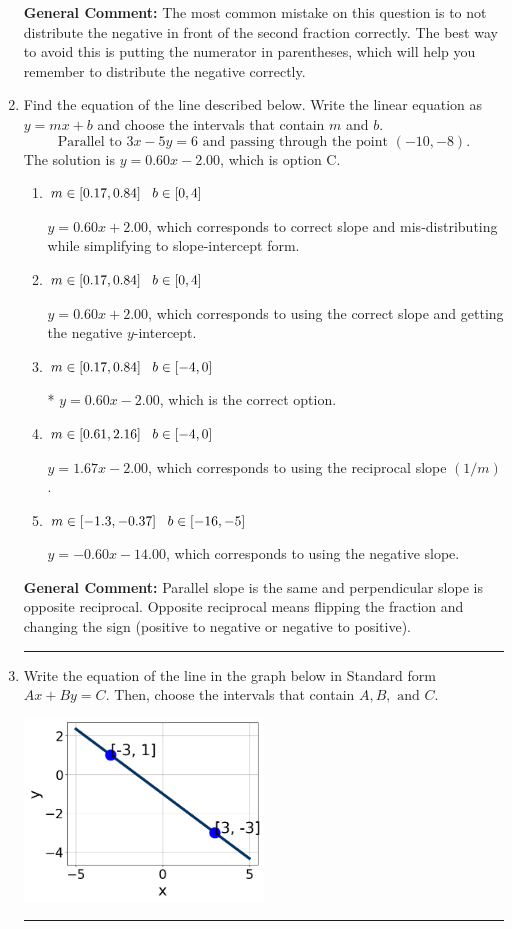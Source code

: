 \documentclass{extbook}[14pt]
\newcommand{\litem}[1]{\item #1

\rule{\textwidth}{0.4pt}}
\begin{document}
\begin{enumerate}
{\textbf{General Comment:} The most common mistake on this question is to not distribute the negative in front of the second fraction correctly. The best way to avoid this is putting the numerator in parentheses, which will help you remember to distribute the negative correctly.
}
\litem{
Find the equation of the line described below. Write the linear equation as $ y=mx+b $ and choose the intervals that contain $m$ and $b$.
\[ \text{Parallel to } 3 x - 5 y = 6 \text{ and passing through the point } (-10, -8). \]The solution is \( y = 0.60x - 2.00 \), which is option C.\begin{enumerate}[label=\Alph*.]
\item \( m \in [0.17, 0.84] \hspace*{3mm} b \in [0, 4] \)

 $y = 0.60x + 2.00$, which corresponds to correct slope and mis-distributing while simplifying to slope-intercept form.
\item \( m \in [0.17, 0.84] \hspace*{3mm} b \in [0, 4] \)

 $y = 0.60x + 2.00$, which corresponds to using the correct slope and getting the negative $y$-intercept.
\item \( m \in [0.17, 0.84] \hspace*{3mm} b \in [-4, 0] \)

* $y = 0.60x - 2.00$, which is the correct option.
\item \( m \in [0.61, 2.16] \hspace*{3mm} b \in [-4, 0] \)

 $y = 1.67x - 2.00$, which corresponds to using the reciprocal slope $(1/m)$.
\item \( m \in [-1.3, -0.37] \hspace*{3mm} b \in [-16, -5] \)

 $y = -0.60x - 14.00$, which corresponds to using the negative slope.
\end{enumerate}

\textbf{General Comment:} Parallel slope is the same and perpendicular slope is opposite reciprocal. Opposite reciprocal means flipping the fraction and changing the sign (positive to negative or negative to positive).
}
\litem{
Write the equation of the line in the graph below in Standard form $Ax+By=C$. Then, choose the intervals that contain $A, B, \text{ and } C$.

\begin{center}
    \includegraphics[width=0.5\textwidth]{../Figures/linearGraphToStandardCopyA.png}
\end{center}


}
\end{enumerate}
\end{document}
